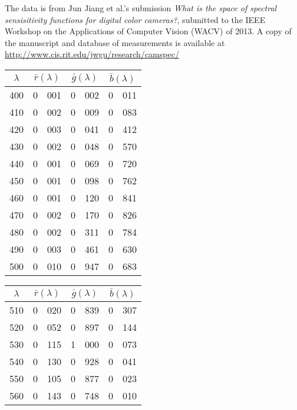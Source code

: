 The data is from Jun Jiang et al.'s submission \textit{What is the space of spectral sensisitivity
functions for digital color cameras?}, submitted to the IEEE Workshop on the Applications of Computer
Vision (WACV) of 2013.
A copy of the manuscript and database of measurements is available at 
\url{http://www.cis.rit.edu/jwgu/research/camspec/}

{
\small
{
\centering


\begin{minipage}{.3\textwidth}
\begin{tabular}{c|r@{.}l | r@{.}l | r@{.}l}
$\lambda$ & \multicolumn{2}{c|}{$\bar r(\lambda)$} &  \multicolumn{2}{c|}{$\bar g(\lambda)$} &  \multicolumn{2}{c}{$\bar b(\lambda)$} \\
\hline
 400 &   0&001 &   0&002 &   0&011 \\
 410 &   0&002 &   0&009 &   0&083 \\
 420 &   0&003 &   0&041 &   0&412 \\
 430 &   0&002 &   0&048 &   0&570 \\
 440 &   0&001 &   0&069 &   0&720 \\
 450 &   0&001 &   0&098 &   0&762 \\
 460 &   0&001 &   0&120 &   0&841 \\
 470 &   0&002 &   0&170 &   0&826 \\
 480 &   0&002 &   0&311 &   0&784 \\
 490 &   0&003 &   0&461 &   0&630 \\
 500 &   0&010 &   0&947 &   0&683 \\
\end{tabular}
\end{minipage}\hskip3mm
\begin{minipage}{.3\textwidth}
\begin{tabular}{c|r@{.}l | r@{.}l | r@{.}l}
$\lambda$ & \multicolumn{2}{c|}{$\bar r(\lambda)$} &  \multicolumn{2}{c|}{$\bar g(\lambda)$} &  \multicolumn{2}{c}{$\bar b(\lambda)$} \\
\hline
 510 &   0&020 &   0&839 &   0&307 \\
 520 &   0&052 &   0&897 &   0&144 \\
 530 &   0&115 &   1&000 &   0&073 \\
 540 &   0&130 &   0&928 &   0&041 \\
 550 &   0&105 &   0&877 &   0&023 \\
 560 &   0&143 &   0&748 &   0&010 \\

\end{tabular}
\end{minipage}}}
